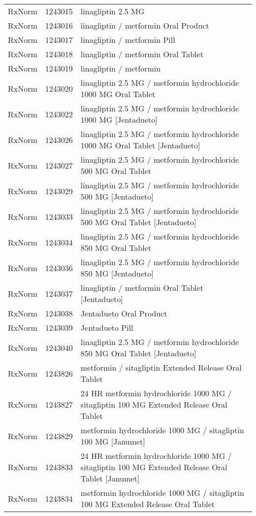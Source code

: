 \begin{longtable}{p{}p{}p{}}
  RxNorm & 1243015 & linagliptin 2.5 MG \\ 
  RxNorm & 1243016 & linagliptin / metformin Oral Product \\ 
  RxNorm & 1243017 & linagliptin / metformin Pill \\ 
  RxNorm & 1243018 & linagliptin / metformin Oral Tablet \\ 
  RxNorm & 1243019 & linagliptin / metformin \\ 
  RxNorm & 1243020 & linagliptin 2.5 MG / metformin hydrochloride 1000 MG Oral Tablet \\ 
  RxNorm & 1243022 & linagliptin 2.5 MG / metformin hydrochloride 1000 MG [Jentadueto] \\ 
  RxNorm & 1243026 & linagliptin 2.5 MG / metformin hydrochloride 1000 MG Oral Tablet [Jentadueto] \\ 
  RxNorm & 1243027 & linagliptin 2.5 MG / metformin hydrochloride 500 MG Oral Tablet \\ 
  RxNorm & 1243029 & linagliptin 2.5 MG / metformin hydrochloride 500 MG [Jentadueto] \\ 
  RxNorm & 1243033 & linagliptin 2.5 MG / metformin hydrochloride 500 MG Oral Tablet [Jentadueto] \\ 
  RxNorm & 1243034 & linagliptin 2.5 MG / metformin hydrochloride 850 MG Oral Tablet \\ 
  RxNorm & 1243036 & linagliptin 2.5 MG / metformin hydrochloride 850 MG [Jentadueto] \\ 
  RxNorm & 1243037 & linagliptin / metformin Oral Tablet [Jentadueto] \\ 
  RxNorm & 1243038 & Jentadueto Oral Product \\ 
  RxNorm & 1243039 & Jentadueto Pill \\ 
  RxNorm & 1243040 & linagliptin 2.5 MG / metformin hydrochloride 850 MG Oral Tablet [Jentadueto] \\ 
  RxNorm & 1243826 & metformin / sitagliptin Extended Release Oral Tablet \\ 
  RxNorm & 1243827 & 24 HR metformin hydrochloride 1000 MG / sitagliptin 100 MG Extended Release Oral Tablet \\ 
  RxNorm & 1243829 & metformin hydrochloride 1000 MG / sitagliptin 100 MG [Janumet] \\ 
  RxNorm & 1243833 & 24 HR metformin hydrochloride 1000 MG / sitagliptin 100 MG Extended Release Oral Tablet [Janumet] \\ 
  RxNorm & 1243834 & metformin hydrochloride 1000 MG / sitagliptin 100 MG Extended Release Oral Tablet \\ 

\end{longtable}
